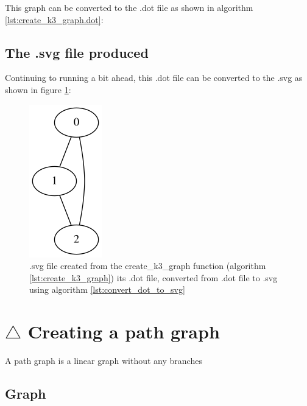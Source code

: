 This graph can be converted to the .dot file as shown in algorithm 
\ref{lst:create_k3_graph.dot}:



\subsection{The .svg file produced}
\label{subsec:create_k3.svg}

Continuing to running a bit ahead, this .dot file can be converted to the
.svg as shown in figure \ref{fig:create_k3_graph.svg}:

\begin{figure}[!htbp]
  \includegraphics[]{create_k3_graph.png}
  \caption{
    .svg file created from the create\_k3\_graph function 
    (algorithm \ref{lst:create_k3_graph}) its .dot file, 
    converted from .dot file to .svg 
    using algorithm \ref{lst:convert_dot_to_svg}
  }
  \label{fig:create_k3_graph.svg}
\end{figure}

\section{$\triangle$ Creating a path graph}
\label{subsec:create_path_graph}

A path graph is a linear graph without any branches

\subsection{Graph}

